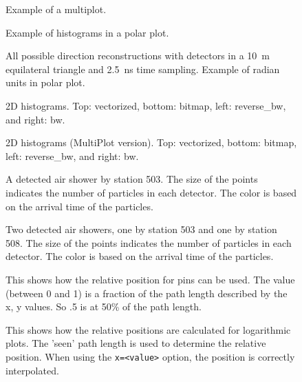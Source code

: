 \documentclass[a4paper,11pt]{article}
\begin{document}
\begin{figure}
\centering

\caption{Example of a multiplot.}
\end{figure}

\begin{figure}
\centering

\caption{Example of histograms in a polar plot.}
\end{figure}

\begin{figure}
\centering

\caption{All possible direction reconstructions with detectors in a
\SI{10}{\meter} equilateral triangle and \SI{2.5}{\nano\second} time
sampling. Example of radian units in polar plot.}
\end{figure}

\begin{figure}
\centering

\caption{2D histograms. Top: vectorized, bottom: bitmap, left:
reverse\_bw, and right: bw.}
\end{figure}

\begin{figure}
\centering

\caption{2D histograms (MultiPlot version). Top: vectorized, bottom:
bitmap, left: reverse\_bw, and right: bw.}
\end{figure}

\begin{figure}
\centering

\caption{A detected air shower by station 503. The size of the points
indicates the number of particles in each detector. The color is based
on the arrival time of the particles.}
\end{figure}

\begin{figure}
\centering

\caption{Two detected air showers, one by station 503 and one by station
508. The size of the points indicates the number of particles in each
detector. The color is based on the arrival time of the particles.}
\end{figure}

\begin{figure}
\centering

\caption{This shows how the relative position for pins can be used.
         The value (between 0 and 1) is a fraction of the path length
         described by the x, y values. So .5 is at 50\% of the path length.}
\end{figure}

\begin{figure}
\centering

\caption{This shows how the relative positions are calculated for
         logarithmic plots. The 'seen' path length is used to determine
         the relative position. When using the \texttt{x=<value>} option, the
         position is correctly interpolated.}
\end{figure}
\end{document}
